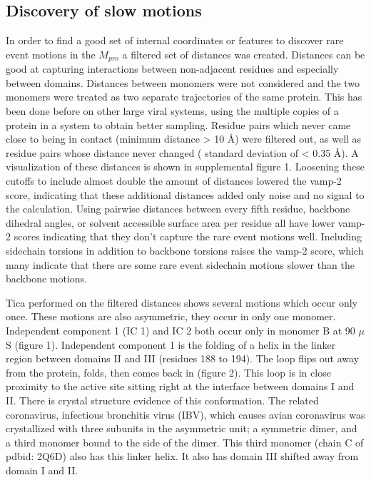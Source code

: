 \documentclass{biophys-new}
\begin{document}
\subsection*{Discovery of slow motions}

In order to find a good set of internal coordinates or features to discover rare event motions in the $M_{pro}$ a filtered set of distances was created. Distances can be good at capturing interactions between non-adjacent residues and especially between domains. Distances between monomers were not considered and the two monomers were treated as two separate trajectories of the same protein. This has been done before on other large viral systems, using the multiple copies of a protein in a system to obtain better sampling.\cite{perilla2017physical, hadden2018all} Residue pairs which never came close to being in contact (minimum distance > 10 Å) were filtered out, as well as residue pairs whose distance never changed ( standard deviation of < 0.35 Å). A visualization of these distances is shown in supplemental figure 1. Loosening these cutoffs to include almost double the amount of distances lowered the vamp-2 score, indicating that these additional distances added only noise and no signal to the calculation. Using pairwise distances between every fifth residue, backbone dihedral angles, or solvent accessible surface area per residue all have lower vamp-2 scores indicating that they don't capture the rare event motions well. Including sidechain torsions in addition to backbone torsions raises the vamp-2 score, which many indicate that there are some rare event sidechain motions slower than the backbone motions.

Tica performed on the filtered distances shows several motions which occur only once. These motions are also asymmetric, they occur in only one monomer. Independent component 1 (IC 1) and IC 2 both occur only in monomer B at 90 $\mu$S (figure 1). Independent component 1 is the folding of a helix in the linker region between domains II and III (residues 188 to 194). The loop flips out away from the protein, folds, then comes back in (figure 2). This loop is in close proximity to the active site sitting right at the interface between domains I and II. There is crystal structure evidence of this conformation. The related coronavirus, infectious bronchitis virus (IBV), which causes avian coronavirus was crystallized with three subunits in the asymmetric unit; a symmetric dimer, and a third monomer bound to the side of the dimer. This third monomer (chain C of pdbid: 2Q6D) also has this linker helix. It also has domain III shifted away from domain I and II.
\end{document}
